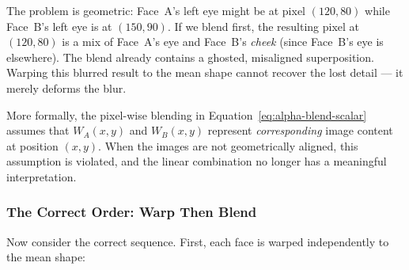 The problem is geometric: Face~A's left eye might be at pixel $(120, 80)$ while Face~B's left
eye is at $(150, 90)$. If we blend first, the resulting pixel at $(120, 80)$ is a mix of
Face~A's eye and Face~B's \emph{cheek} (since Face~B's eye is elsewhere). The blend already
contains a ghosted, misaligned superposition. Warping this blurred result to the mean shape
cannot recover the lost detail --- it merely deforms the blur.

More formally, the pixel-wise blending in Equation~\eqref{eq:alpha-blend-scalar} assumes that
$W_A(x, y)$ and $W_B(x, y)$ represent \emph{corresponding} image content at position $(x, y)$.
When the images are not geometrically aligned, this assumption is violated, and the linear
combination no longer has a meaningful interpretation.

\subsubsection{The Correct Order: Warp Then Blend}

Now consider the correct sequence. First, each face is warped independently to the mean shape:

